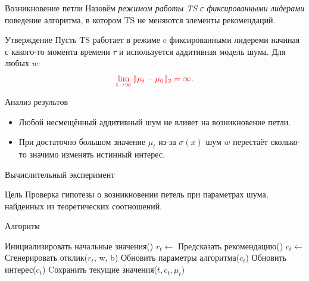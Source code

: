 \documentclass{beamer}
\begin{document}
\begin{frame}{Возникновение петли}
Назовём \textit{режимом работы TS с фиксированными лидерами} поведение алгоритма, в котором TS не меняются элементы рекомендаций.
  \begin{block}{Утверждение}
  Пусть  TS работает в режиме c фиксированными лидереми начиная с какого-то момента времени $\tau$ и используется аддитивная модель шума. 
  Для любых $w$:
\begin{gather*}
  \color{red} \lim_{t \to \infty} \|\mu_t - \mu_0 \|_2 = \infty.
\end{gather*}
  \end{block}
  \begin{block}{Анализ результов}
  \begin{itemize}
      \item Любой несмещённый аддитивный шум не влияет на возникновение петли. 
      \item При достаточно большом значение $\mu_t$ из-за $\sigma (x)$ шум $w$ перестаёт сколько-то значимо изменять истинный интерес. 
  \end{itemize}
  \end{block}
\end{frame}
\begin{frame}{Вычислительный эксперимент}
\begin{block}{Цель}
Проверка гипотезы о возникновении петель при параметрах шума, найденных из теоретических соотношений. 
\end{block}

\begin{block}{Алгоритм}
\begin{algorithmic}
  \STATE Инициализировать начальные значения()
  \STATE $r_t \leftarrow$ Предсказать рекомендацию()
    \STATE $c_t \leftarrow$ Сгенерировать отклик($r_t$, w, b)
    \STATE Обновить параметры алгоритма($c_t$)
    \STATE Обновить интерес($c_t$)
    \STATE Cохранить текущие значения($t, c_t, \mu_t$)
  \ENDFOR
\end{algorithmic}
\end{block}

\end{frame}
\end{document}
